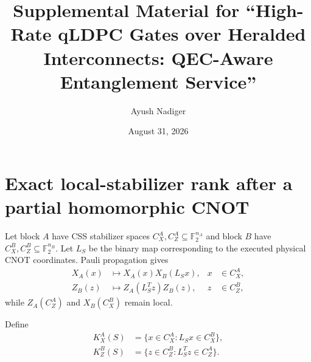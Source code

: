 \documentclass[aps,prx,preprint,superscriptaddress,nofootinbib,longbibliography]{revtex4-2}
\newcommand{\F}{\mathbb F_2}\newcommand{\E}{\mathbb E}\newcommand{\codim}{\operatorname{codim}}
\begin{document}
\title{Supplemental Material for ``High-Rate qLDPC Gates over Heralded Interconnects: QEC-Aware Entanglement Service''}
\author{Ayush Nadiger}
\date{August 31, 2026}\maketitle

\section{Exact local-stabilizer rank after a partial homomorphic CNOT}
Let block $A$ have CSS stabilizer spaces $C_X^A,C_Z^A\subseteq\F^{n_A}$ and block $B$ have $C_X^B,C_Z^B\subseteq\F^{n_B}$. Let $L_S$ be the binary map corresponding to the executed physical CNOT coordinates. Pauli propagation gives
\begin{align}
X_A(x)&\longmapsto X_A(x)X_B(L_Sx), & x&\in C_X^A,\\
Z_B(z)&\longmapsto Z_A(L_S^Tz)Z_B(z), & z&\in C_Z^B,
\end{align}
while $Z_A(C_Z^A)$ and $X_B(C_X^B)$ remain local.

Define
\begin{align}
K_X^A(S)&=\{x\in C_X^A:L_Sx\in C_X^B\},\\
K_Z^B(S)&=\{z\in C_Z^B:L_S^Tz\in C_Z^A\}.
\end{align}
\end{document}
